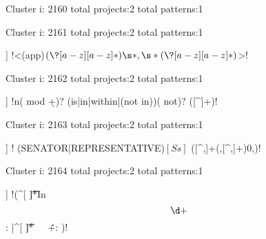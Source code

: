 Cluster i: 2160
total projects:2
total patterns:1
\begin{multicols}{1}
\end{multicols}







Cluster i: 2161
total projects:2
total patterns:1
\begin{multicols}{1}
\begin{description}[noitemsep,topsep=0pt]
\item [[2] ] \cverb!<(app)\((\?[a-z][a-z]*)\s*,\s*(\?[a-z][a-z]*)\)>!
\end{description}
\end{multicols}







Cluster i: 2162
total projects:2
total patterns:1
\begin{multicols}{1}
\begin{description}[noitemsep,topsep=0pt]
\item [[2] ] \cverb!n( mod \d+)? (is|in|within|(not in))( not)? ([^\s]+)!
\end{description}
\end{multicols}







Cluster i: 2163
total projects:2
total patterns:1
\begin{multicols}{1}
\begin{description}[noitemsep,topsep=0pt]
\item [[2] ] \cverb! (SENATOR|REPRESENTATIVE)\([Ss]\) ([^,]+(,[^,]+){0,})!
\end{description}
\end{multicols}







Cluster i: 2164
total projects:2
total patterns:1
\begin{multicols}{1}
\begin{description}[noitemsep,topsep=0pt]
\item [[2] ] \cverb!(^[ \t]*In \[\d+\]: |^[ \t]*\ \ \ \.\.\.+: )!
\end{description}
\end{multicols}








